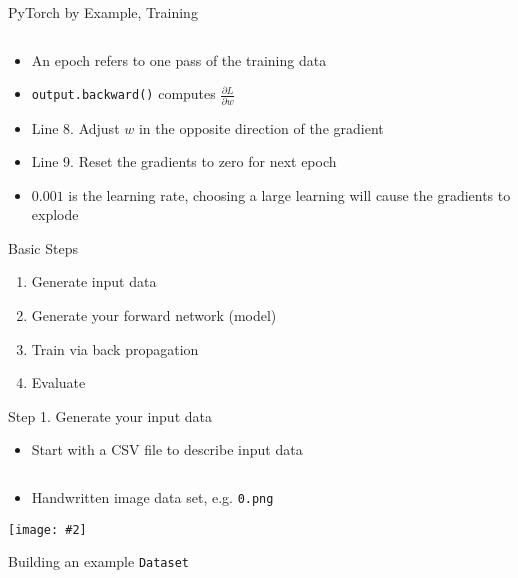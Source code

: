 \documentclass[hyperref={pdfpagelabels=false},12pt]{beamer}
\newcommand{\ig}[2]{\texttt{[image: \#2]}}
\newcommand{\code}[2]{\texttt{#2}}
\newcommand{\python}[1]{\code{python}{#1}}
\newcommand{\pygment}[3]{\inputminted[bgcolor=lightgray,linenos,fontsize=#1]{#2}{#3}}
\newcommand{\pygmentLines}[5]{\inputminted[bgcolor=lightgray,linenos,fontsize=#1,firstline=#2,lastline=#3,autogobble]{#4}{#5}}
\begin{document}
\begin{frame}{PyTorch by Example, Training}
  \pygment{\scriptsize}{python}{code/basic-training.2.py}
  \vspace{-0.5cm}
  \begin{itemize}
      \item An epoch refers to one pass of the training data
      \item \code{python}{output.backward()} computes $\frac{\partial L}{\partial w}$
      \item Line 8. Adjust $w$ in the opposite direction of the gradient
      \item Line 9. Reset the gradients to zero for next epoch
      \item $0.001$ is the learning rate, choosing a large learning will cause
        the gradients to explode
  \end{itemize}
\end{frame}

\begin{frame}{Basic Steps}
  \begin{enumerate}
      \item Generate input data
      \item Generate your forward network (model)
      \item Train via back propagation
      \item Evaluate
  \end{enumerate}
\end{frame}

\begin{frame}{Step 1. Generate your input data}
  \begin{itemize}
    \item Start with a CSV file to describe input data
  \end{itemize}
  \pygmentLines{\scriptsize}{1}{5}{text}{data/mnist.csv}
  \begin{itemize}
    \item Handwritten image data set, e.g. \texttt{0.png}
  \end{itemize}
  \begin{center}
    \ig{0.25}{figures/0.png}
  \end{center}
\end{frame}

\begin{frame}{Building an example \python{Dataset}}
  \pygment{\scriptsize}{python}{code/basic-dataset.py}
\end{frame}
\end{document}
